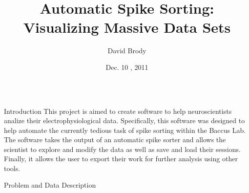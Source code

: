 \documentclass[final,t]{beamer}
\title{\huge Automatic Spike Sorting: Visualizing Massive Data Sets}
\author{David Brody}
\institute[Stanford University]{Department of Computer Science,
  Stanford University, Stanford, California}
\date[Dec. 10 , 2011]{Dec. 10 , 2011}
\begin{document}
\begin{frame}{} 
  \begin{columns}[t]
    \begin{column}{.3\linewidth}


      \begin{block}{Introduction}
             This project is aimed to create software to 
             \alert{help neuroscientists analize their
               electrophysiological data}. Specifically, this software was designed to help automate
             the currently tedious task of spike sorting within the
             Baccus Lab. The software takes the output of an automatic
             spike sorter and allows the scientist to explore and modify
             the data as well as save and load their
             sessions. Finally, it allows the user to export their
             work for further analysis using other tools.
       \end{block}


       \begin{block}{Problem and Data Description }
        

\end{block}
\end{column}
\end{columns}
\end{frame}
\end{document}
